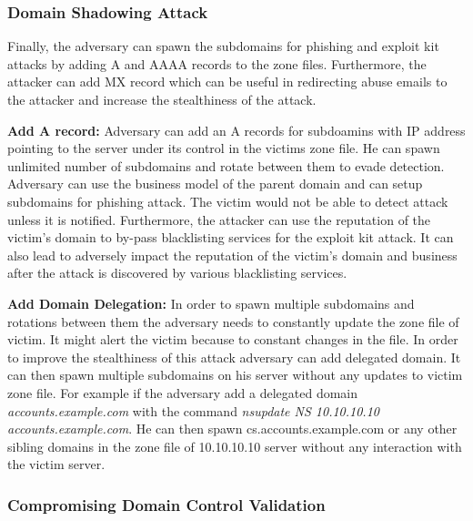 \subsubsection{Domain Shadowing Attack}

Finally, the adversary can spawn the subdomains for phishing and exploit kit attacks by adding A and AAAA records to the zone files. Furthermore, the attacker can add MX record which can be useful in redirecting abuse emails to the attacker and increase the stealthiness of the attack. 

\textbf{Add A record:} 
Adversary can add an A records for subdoamins with IP address pointing to the server under its control in the victims zone file. He can spawn unlimited number of subdomains and rotate between them to evade detection. Adversary can use the business model of the parent domain and can setup subdomains for phishing attack. The victim would not be able to detect attack unless it is notified. Furthermore, the attacker can use the reputation of the victim's domain to by-pass blacklisting services for the exploit kit attack. It can also lead to adversely impact the reputation of the victim's domain and business after the attack is discovered by various blacklisting services.

\textbf{Add Domain Delegation:}
In order to spawn multiple subdomains and rotations between them the adversary needs to constantly update the zone file of victim. It might alert the victim because to constant changes in the file. In order to improve the stealthiness of this attack adversary can add delegated domain. It can then spawn multiple subdomains on his server without any updates to victim zone file. For example if the adversary add a delegated domain
\textit{accounts.example.com} with the command %
\textit{nsupdate NS 10.10.10.10 accounts.example.com}. He can then spawn cs.accounts.example.com or any other sibling domains in the zone file of 10.10.10.10 server without any interaction with the victim server. 




\subsubsection{Compromising Domain Control Validation\label{sec:domainvalidation}}


